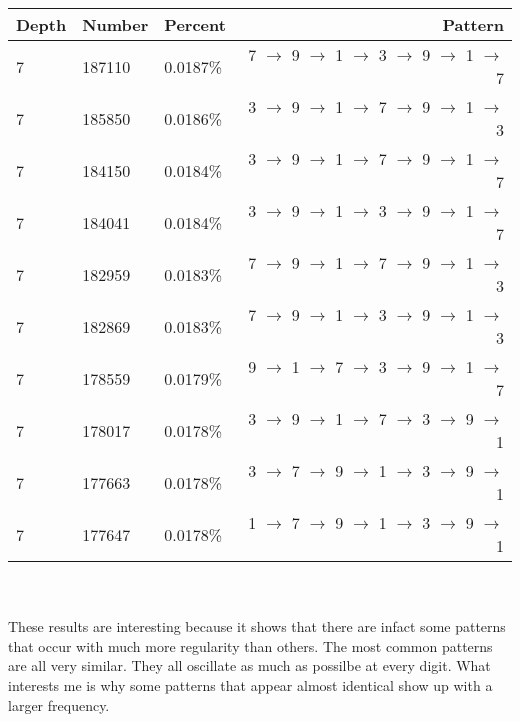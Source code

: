 \documentclass[13pt]{article}
\begin{document}
\begin{tabular}{ l l l r }
  Depth & Number & Percent & Pattern \\
  \hline
  7 & 187110 & 0.0187\% & 7 $\rightarrow$ 9 $\rightarrow$ 1 $\rightarrow$ 3 $\rightarrow$ 9 $\rightarrow$ 1 $\rightarrow$ 7\\
  7 & 185850 & 0.0186\% & 3 $\rightarrow$ 9 $\rightarrow$ 1 $\rightarrow$ 7 $\rightarrow$ 9 $\rightarrow$ 1 $\rightarrow$ 3\\
  7 & 184150 & 0.0184\% & 3 $\rightarrow$ 9 $\rightarrow$ 1 $\rightarrow$ 7 $\rightarrow$ 9 $\rightarrow$ 1 $\rightarrow$ 7\\
  7 & 184041 & 0.0184\% & 3 $\rightarrow$ 9 $\rightarrow$ 1 $\rightarrow$ 3 $\rightarrow$ 9 $\rightarrow$ 1 $\rightarrow$ 7\\
  7 & 182959 & 0.0183\% & 7 $\rightarrow$ 9 $\rightarrow$ 1 $\rightarrow$ 7 $\rightarrow$ 9 $\rightarrow$ 1 $\rightarrow$ 3\\
  7 & 182869 & 0.0183\% & 7 $\rightarrow$ 9 $\rightarrow$ 1 $\rightarrow$ 3 $\rightarrow$ 9 $\rightarrow$ 1 $\rightarrow$ 3\\
  7 & 178559 & 0.0179\% & 9 $\rightarrow$ 1 $\rightarrow$ 7 $\rightarrow$ 3 $\rightarrow$ 9 $\rightarrow$ 1 $\rightarrow$ 7\\
  7 & 178017 & 0.0178\% & 3 $\rightarrow$ 9 $\rightarrow$ 1 $\rightarrow$ 7 $\rightarrow$ 3 $\rightarrow$ 9 $\rightarrow$ 1\\
  7 & 177663 & 0.0178\% & 3 $\rightarrow$ 7 $\rightarrow$ 9 $\rightarrow$ 1 $\rightarrow$ 3 $\rightarrow$ 9 $\rightarrow$ 1\\
  7 & 177647 & 0.0178\% & 1 $\rightarrow$ 7 $\rightarrow$ 9 $\rightarrow$ 1 $\rightarrow$ 3 $\rightarrow$ 9 $\rightarrow$ 1\\
  \end{tabular}\\\\
  These results are interesting because it shows that there are infact some patterns that occur with much more regularity than others. The most common patterns are all very similar. They all oscillate as much as possilbe at every digit. What interests me is why some patterns that appear almost identical show up with a larger frequency. 
\end{document}
